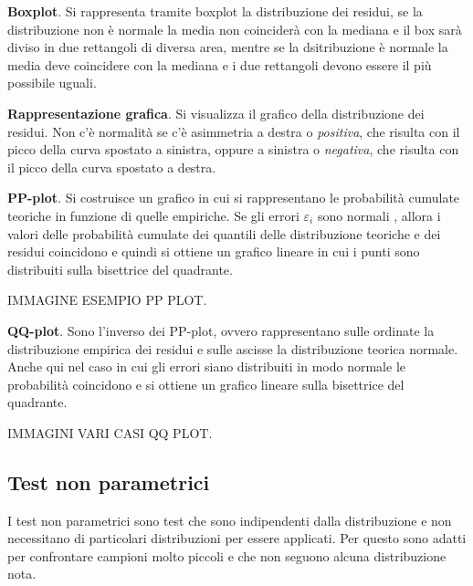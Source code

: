 \textbf{Boxplot}. Si rappresenta tramite boxplot la distribuzione dei residui, se la distribuzione non è normale la media non coinciderà con la mediana e il box sarà diviso in due rettangoli di diversa area, mentre se la dsitribuzione è normale la media deve coincidere con la mediana e i due rettangoli devono essere il più possibile uguali.

\textbf{Rappresentazione grafica}. Si visualizza il grafico della distribuzione dei residui. Non c'è normalità se c'è asimmetria a destra o \textit{positiva}, che risulta con il picco della curva spostato a sinistra, oppure a sinistra o \textit{negativa}, che risulta con il picco della curva spostato a destra.

\textbf{PP-plot}. Si costruisce un grafico in cui si rappresentano le probabilità cumulate teoriche in funzione di quelle empiriche. Se gli errori $\varepsilon_i$ sono normali , allora i valori delle probabilità cumulate dei quantili delle distribuzione teoriche e dei residui coincidono e quindi si ottiene un grafico lineare in cui i punti sono distribuiti sulla bisettrice del quadrante.

IMMAGINE ESEMPIO PP PLOT.

\textbf{QQ-plot}. Sono l'inverso dei PP-plot, ovvero rappresentano sulle ordinate la distribuzione empirica dei residui e sulle ascisse la distribuzione teorica normale. Anche qui nel caso in cui gli errori siano distribuiti in modo normale le probabilità coincidono e si ottiene un grafico lineare sulla bisettrice del quadrante.

IMMAGINI VARI CASI QQ PLOT.

\subsection{Test non parametrici}
I test non parametrici sono test che sono indipendenti dalla distribuzione e non necessitano di particolari distribuzioni per essere applicati. Per questo sono adatti per confrontare campioni molto piccoli e che non seguono alcuna distribuzione nota.

